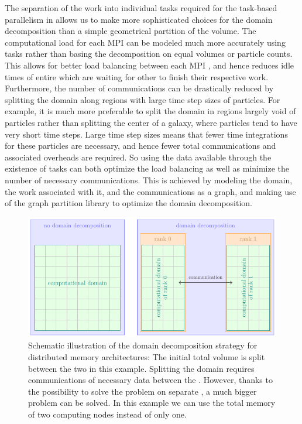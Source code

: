 The separation of the work into individual tasks required for the task-based parallelism in
\swift allows us to make more sophisticated choices for the domain decomposition than a simple
geometrical partition of the volume. The computational load for each MPI  can be
modeled much more accurately using tasks rather than basing the decomposition on equal volumes or
particle counts. This allows for better load balancing between each MPI , and hence
reduces idle times of entire  which are waiting for other  to finish
their respective work. Furthermore, the number of communications can be drastically reduced by
splitting the domain along regions with large time step sizes of particles. For example, it is much
more preferable to split the domain in regions largely void of particles rather than splitting the
center of a galaxy, where particles tend to have very short time steps. Large time step sizes means
that fewer time integrations for these particles are necessary, and hence fewer total communications
and associated overheads are required. So using the data available through the existence of tasks
can both optimize the load balancing as well as minimize the number of necessary communications.
This is achieved by modeling the domain, the work associated with it, and the communications as a
graph, and making use of the graph partition library 
\citep{karypisFastHighQuality1998} to optimize the domain decomposition.

\begin{figure}
 \centering
 \includegraphics{figures/Meshless/domain_decomposition.pdf}%
 \caption{
Schematic illustration of the domain decomposition strategy for distributed memory architectures:
The initial total volume is split between the two  in this example. Splitting the
domain requires communications of necessary data between the . However, thanks to the
possibility to solve the problem on separate , a much bigger problem can be solved. In
this example we can use the total memory of two computing nodes instead of only one.
 }
 \label{fig:domain-decomposition}
\end{figure}







